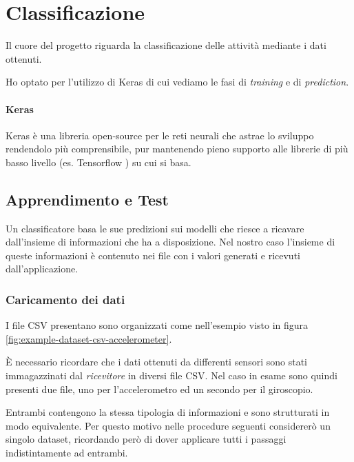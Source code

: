\chapter{Classificazione}
\label{chapter:classification}

Il cuore del progetto riguarda la classificazione delle attività mediante i dati ottenuti.

Ho optato per l'utilizzo di Keras di cui vediamo le fasi di \textit{training} e di \textit{prediction}.
\subsubsection{Keras}
Keras \cite{keras} è una libreria open-source per le reti neurali che astrae lo sviluppo rendendolo più comprensibile, 
pur mantenendo pieno supporto alle librerie di più basso livello (es. Tensorflow \cite{tensorflow}) su cui si basa.



\section{Apprendimento e Test}
Un classificatore basa le sue predizioni sui modelli che riesce a ricavare dall'insieme di informazioni che ha a disposizione.
Nel nostro caso l'insieme di queste informazioni è contenuto nei file con i valori generati e ricevuti dall'applicazione.


\subsection{Caricamento dei dati}
I file CSV presentano sono organizzati come nell'esempio visto in figura \ref{fig:example-dataset-csv-accelerometer}.

È necessario ricordare che i dati ottenuti da differenti sensori sono stati immagazzinati dal \textit{ricevitore} in diversi file CSV. 
Nel caso in esame sono quindi presenti due file, uno per l'accelerometro ed un secondo per il giroscopio.

Entrambi contengono la stessa tipologia di informazioni e sono strutturati in modo equivalente.
Per questo motivo nelle procedure seguenti considererò un singolo dataset, ricordando però di dover applicare tutti i 
passaggi indistintamente ad entrambi.

